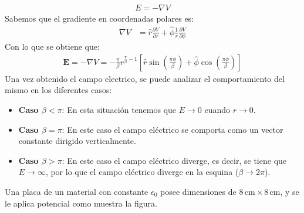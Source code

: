 \documentclass[
  11pt,
  letterpaper,
   addpoints,
   answers
  ]{exam}
\begin{document}
\begin{questions}
\begin{solution}
\begin{enumerate}
    \begin{align}
        E = -\nabla V 
    \end{align}
    Sabemos que el gradiente en coordenadas polares es:
    \begin{align}
        \nabla V &= \hat{r} \frac{\partial V}{\partial r} + \hat{\phi} \frac{1}{r}\frac{\partial V}{\partial \phi}
    \end{align}
    Con lo que se obtiene que:
    \begin{align}
        \mathbf{E} = -\nabla V = -\frac{\pi}{\beta} r^{\frac{\pi}{\beta}-1} \left[ \hat{r} \sin\left( \frac{\pi \phi}{\beta} \right) + \hat{\phi} \cos\left( \frac{\pi \phi}{\beta} \right) \right]
    \end{align}
    Una vez obtenido el campo electrico, se puede analizar el comportamiento del mismo en los diferentes casos:

    \begin{itemize}
        \item \textbf{Caso \(\beta < \pi\)}: En esta situación tenemos que \(E \rightarrow 0\) cuando \(r \rightarrow 0\).
        \item \textbf{Caso \(\beta = \pi\)}: En este caso el campo eléctrico se comporta como un vector constante dirigido verticalmente.
        \item \textbf{Caso \(\beta > \pi\)}: En este caso el campo eléctrico diverge, es decir, se tiene que \(E \rightarrow \infty\), por lo que el campo eléctrico diverge en la esquina (\(\beta \rightarrow 2\pi\)).
    \end{itemize}
    
    \end{enumerate}
    \end{solution}
    \question  Una placa de un material con constante $\epsilon_{0}$ posee dimensiones de \(8 \, \text{cm} \times 8 \, \text{cm}\), y se le aplica potencial como muestra la figura.
    \begin{center}
\end{center}
\end{questions}
\end{document}
